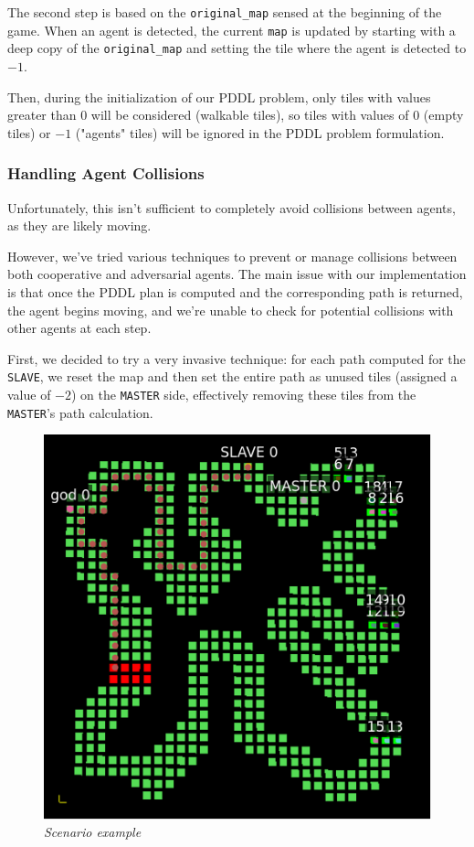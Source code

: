 \documentclass[10pt]{article}
\begin{document}
The second step is based on the \texttt{original\_map} sensed at the beginning of the game. When an agent is detected, the current \texttt{map} is updated by starting with a deep copy of the \texttt{original\_map} and setting the tile where the agent is detected to $-1$. 

Then, during the initialization of our PDDL problem, only tiles with values greater than $0$ will be considered (walkable tiles), so tiles with values of $0$ (empty tiles) or $-1$ ("agents" tiles) will be ignored in the PDDL problem formulation.

\subsubsection{Handling Agent Collisions}

Unfortunately, this isn't sufficient to completely avoid collisions between agents, as they are likely moving.

However, we've tried various techniques to prevent or manage collisions between both cooperative and adversarial agents. The main issue with our implementation is that once the PDDL plan is computed and the corresponding path is returned, the agent begins moving, and we're unable to check for potential collisions with other agents at each step.  

First, we decided to try a very invasive technique: for each path computed for the \texttt{SLAVE}, we reset the map and then set the entire path as unused tiles (assigned a value of $-2$) on the \texttt{MASTER} side, effectively removing these tiles from the \texttt{MASTER}'s path calculation. 

\begin{figure}[H]
    \centering
    \includegraphics[width=0.5\linewidth]{path_-1.png}
    \caption{\centering \textit{Scenario example}}
    \label{fig:enter-label}
\end{figure}
\end{document}
